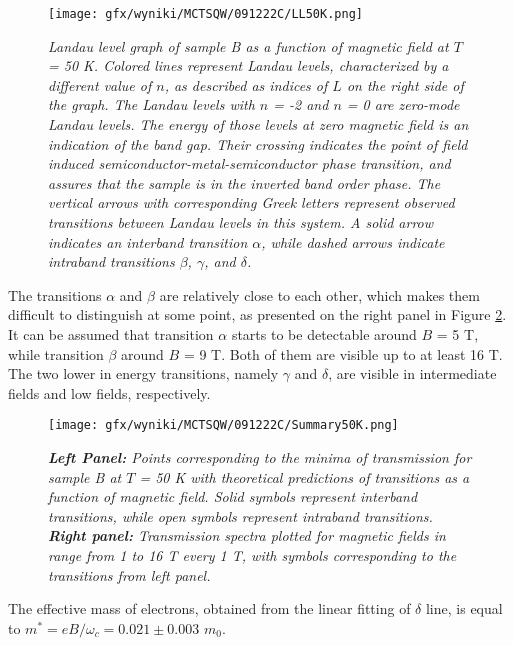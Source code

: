 \documentclass[titlepage,a4paper]{book}
\begin{document}
\begin{figure}[ht]
	\centering
	\texttt{[image: gfx/wyniki/MCTSQW/091222C/LL50K.png]}
	\vspace{-10pt}
	\caption{\textit{Landau level graph of sample B as a function of magnetic field at $T$ = 50 K. Colored lines represent Landau levels, characterized by a different value of $n$, as described as indices of $L$ on the right side of the graph. The Landau levels with $n$ = -2 and $n$ = 0 are zero-mode Landau levels. The energy of those levels at zero magnetic field is an indication of the band gap. Their crossing indicates the point of field induced semiconductor-metal-semiconductor phase transition, and assures that the sample is in the inverted band order phase. The vertical arrows with corresponding Greek letters represent observed transitions between Landau levels in this system. A solid arrow indicates an interband transition $\alpha$, while dashed arrows indicate intraband transitions $\beta$, $\gamma$, and $\delta$.}}
	\label{fig:LL_SQW_50K}
\end{figure}

The transitions $\alpha$ and $\beta$ are relatively close to each other, which makes them difficult to distinguish at some point, as presented on the right panel in Figure \ref{fig:Summary_SQW_50K}. It can be assumed that transition $\alpha$ starts to be detectable around $B$ = 5 T, while transition $\beta$ around $B$ = 9 T. Both of them are visible up to at least 16 T. The two lower in energy transitions, namely $\gamma$ and $\delta$, are visible in intermediate fields and low fields, respectively.
\begin{figure}[ht]
	\centering
	\texttt{[image: gfx/wyniki/MCTSQW/091222C/Summary50K.png]}
	\vspace{-10pt}
	\caption{\textit{\textbf{Left Panel:} Points corresponding to the minima of transmission for sample B at $T$ = 50 K with theoretical predictions of transitions as a function of magnetic field. Solid symbols represent interband transitions, while open symbols represent intraband transitions. \textbf{Right panel:} Transmission spectra plotted for magnetic fields in range from 1 to 16 T every 1 T, with symbols corresponding to the transitions from left panel.}}
	\label{fig:Summary_SQW_50K}
\end{figure}

The effective mass of electrons, obtained from the linear fitting of $\delta$ line, is equal to $m^* = eB/\omega_c = 0.021 \pm 0.003$ $m_0$.
\end{document}
